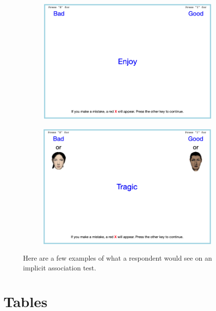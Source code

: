 \documentclass[12pt, fullpage]{article}
\newcommand{\note}[1]{\flushleft\footnotesize{#1}}
\begin{document}
\begin{figure}[H]
\begin{subfigure}{.48\textwidth}
\end{subfigure}
\begin{subfigure}{.48\textwidth}
\centering
\includegraphics[width=.9\linewidth]{figure/iatexample4.png}
\end{subfigure}
\begin{subfigure}{.48\textwidth}
\centering
\includegraphics[width=.9\linewidth]{figure/iatexample5.png}
\end{subfigure}
\flushleft\footnotesize{\note{Here are a few examples of what a respondent would see on an implicit association test.}}
\end{figure}


\section{Tables}



\pagebreak
\newpage




\pagebreak
\newpage



\pagebreak
\newpage



\pagebreak
\newpage



\pagebreak
\newpage



\end{document}
